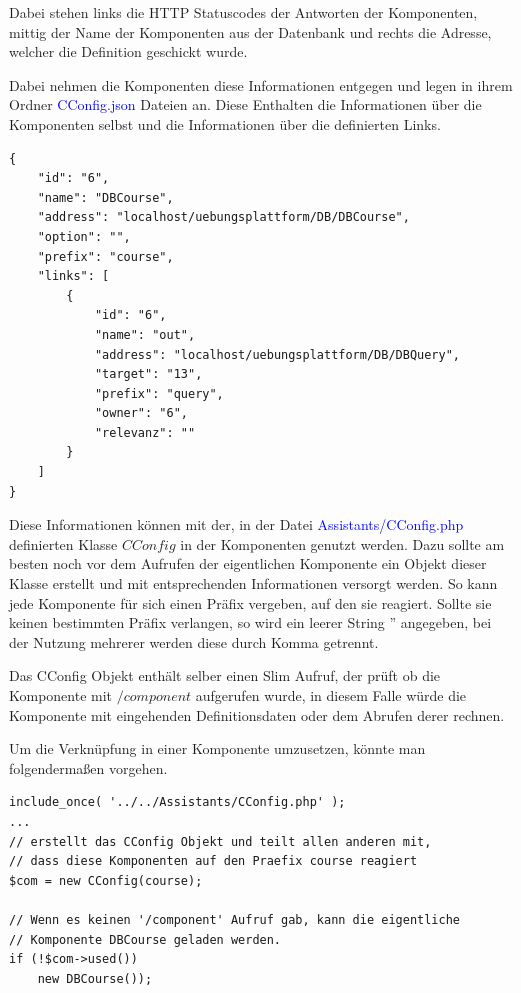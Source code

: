 \documentclass[10pt,a4paper,final,parskip]{scrartcl}
\newcommand{\blau}[1]{\textcolor{blue}{#1}}
\begin{document}
Dabei stehen links die HTTP Statuscodes der Antworten der Komponenten, mittig der Name der Komponenten aus der Datenbank und rechts die Adresse, welcher die Definition geschickt wurde.

Dabei nehmen die Komponenten diese Informationen entgegen und legen in ihrem Ordner \blau{CConfig.json} Dateien an.
Diese Enthalten die Informationen über die Komponenten selbst und die Informationen über die definierten Links.

\begin{minipage}{\textwidth}
\begin{lstlisting}
{
    "id": "6",
    "name": "DBCourse",
    "address": "localhost/uebungsplattform/DB/DBCourse",
    "option": "",
    "prefix": "course",
    "links": [
        {
            "id": "6",
            "name": "out",
            "address": "localhost/uebungsplattform/DB/DBQuery",
            "target": "13",
            "prefix": "query",
            "owner": "6",
            "relevanz": ""
        }
    ]
}
\end{lstlisting}
\end{minipage}

Diese Informationen können mit der, in der Datei \blau{Assistants/CConfig.php} definierten Klasse $CConfig$ in der Komponenten genutzt werden.
Dazu sollte am besten noch vor dem Aufrufen der eigentlichen Komponente ein Objekt dieser Klasse erstellt und mit entsprechenden Informationen versorgt werden. So kann jede Komponente für sich einen Präfix vergeben, auf den sie reagiert. Sollte sie keinen bestimmten Präfix verlangen, so wird ein leerer String '' angegeben, bei der Nutzung mehrerer werden diese durch Komma getrennt.

Das CConfig Objekt enthält selber einen Slim Aufruf, der prüft ob die Komponente mit $/component$ aufgerufen wurde, in diesem Falle würde die Komponente mit eingehenden Definitionsdaten oder dem Abrufen derer rechnen.

Um die Verknüpfung in einer Komponente umzusetzen, könnte man folgendermaßen vorgehen.

\begin{minipage}{\textwidth}
\begin{lstlisting}
include_once( '../../Assistants/CConfig.php' );
...
// erstellt das CConfig Objekt und teilt allen anderen mit,
// dass diese Komponenten auf den Praefix course reagiert
$com = new CConfig(course);

// Wenn es keinen '/component' Aufruf gab, kann die eigentliche
// Komponente DBCourse geladen werden.
if (!$com->used())
    new DBCourse());
  
\end{lstlisting}
\end{minipage}
\end{document}
